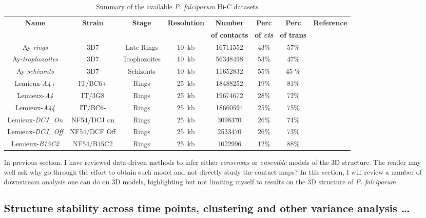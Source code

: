 \documentclass[2columns]{article}
\begin{document}
\begin{table}
\scriptsize
\centering
\begin{tabular}{cccccccc}
\hline
\multirow{2}{*}{\textbf{Name}} & \multirow{2}{*}{\textbf{Strain}} &
\multirow{2}{*}{\textbf{Stage}} & \multirow{2}{*}{\textbf{Resolution}} &
\textbf{Number} & \textbf{Perc} & \textbf{Perc}& \multirow{2}{*}{\textbf{Reference}} \\
& & & & \textbf{of contacts} & \textbf{of \textit{cis}}& \textbf{of trans}& \\
\hline
\hline
Ay-\textit{rings} & 3D7 & Late Rings & 10~kb & 16711552 & 43\% & 57\% &  \cite{ay:three-dimensional} \\
Ay-\textit{trophozoites} & 3D7 & Trophozoites &10~kb & 56348498 & 53\% & 47\% & \cite{ay:three-dimensional} \\
Ay-\textit{schizonts} & 3D7 & Schizonts & 10~kb & 11652832 & 55\% & 45 \% & \cite{ay:three-dimensional} \\
Lemieux-\textit{A4+} & IT/BC6+ & Rings & 25~kb & 18488252 & 19\% & 81\% & \cite{lemieux:genome-wide} \\
Lemieux-\textit{A4} & IT/3G8 & Rings &  25~kb & 19674672 & 28\% & 72\% & \cite{lemieux:genome-wide}\\
Lemieux-\textit{A44} & IT/BC6- & Rings & 25~kb & 18660594 & 25\% & 75\% & \cite{lemieux:genome-wide}\\
Lemieux-\textit{DCJ\_On} & NF54/DCJ on & Rings & 25~kb & 3098370 & 26\% & 74\% &\cite{lemieux:genome-wide} \\
Lemieux-\textit{DCJ\_Off} & NF54/DCF Off & Rings & 25~kb & 2533470 & 26\% & 73\% &\cite{lemieux:genome-wide} \\
Lemieux-\textit{B15C2} & NF54/B15C2 & Rings & 25~kb &  1022996 & 12\% & 88\% & \cite{lemieux:genome-wide}\\
\hline
\end{tabular}
\caption{Summary of the available {\em P. falciparum} Hi-C datasets}
\end{table}

In previous section, I have reviewed data-driven methods to infer either
\textit{consensus} or \textit{ensemble} models of the 3D structure. The reader
may well ask why go through the effort to obtain such model and not directly
study the contact maps?  In this section, I will review a number of downstream
analysis one can do on 3D models, highlighting but not limiting myself to results
on the 3D structure of {\em P. falciparum}.

\subsection*{Structure stability across time points, clustering and other
variance analysis \dots}
\end{document}
